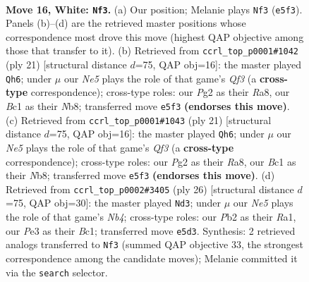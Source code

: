\documentclass[11pt]{article}
\begin{document}
\clearpage

\begin{figure}[p]\centering
\begin{subfigure}{0.46\textwidth}\centering
\resizebox{\linewidth}{!}{%
\newchessgame
\chessboard[
  setfen={r1b1k2r/ppq3pp/2pb4/3pNp2/3P4/1Q2P3/PP3PPP/1RB1K2R w K - 2 16},
  showmover=false,
  pgfstyle=straightmove, color=movearrow, markmove={e5-f3}
]}
\caption{}
\end{subfigure}\hfill
\begin{subfigure}{0.46\textwidth}\centering
\resizebox{\linewidth}{!}{%
\newchessgame
\chessboard[
  setfen={rn2kb1r/p2p1ppp/1p2pq2/8/2PB4/P3PP2/1P3P1P/R2QKB1R b KQkq - 0 11},
  showmover=false,
  pgfstyle=straightmove, color=movearrow, markmove={f6-h6}
]}
\caption{}
\end{subfigure}
\\[4pt]
\begin{subfigure}{0.46\textwidth}\centering
\resizebox{\linewidth}{!}{%
\newchessgame
\chessboard[
  setfen={rn2kb1r/p2p1ppp/1p2pq2/8/2PB4/P3PP2/1P3P1P/R2QKB1R b KQkq - 0 11},
  showmover=false,
  pgfstyle=straightmove, color=movearrow, markmove={f6-h6}
]}
\caption{}
\end{subfigure}\hfill
\begin{subfigure}{0.46\textwidth}\centering
\resizebox{\linewidth}{!}{%
\newchessgame
\chessboard[
  setfen={r1b1k2r/3q1ppp/4pb2/p1Pp4/1N1P4/2P5/P4PPP/R1BQK2R w KQkq - 0 14},
  showmover=false,
  pgfstyle=straightmove, color=movearrow, markmove={b4-d3}
]}
\caption{}
\end{subfigure}
\caption{\textbf{Move 16, White: \texttt{Nf3}.} (a) Our position; Melanie plays \texttt{Nf3} (\texttt{e5f3}). Panels (b)--(d) are the retrieved master positions whose correspondence most drove this move (highest QAP objective among those that transfer to it). (b) Retrieved from \texttt{ccrl\_top\_p0001\#1042} (ply 21) [structural distance $d$=75, QAP obj=16]: the master played \texttt{Qh6}; under $\mu$ our \emph{Ne5} plays the role of that game's \emph{Qf3} (a \textbf{cross-type} correspondence); cross-type roles: our \emph{P}g2 as their \emph{R}a8, our \emph{B}c1 as their \emph{N}b8; transferred move \texttt{e5f3} \textbf{(endorses this move)}. (c) Retrieved from \texttt{ccrl\_top\_p0001\#1043} (ply 21) [structural distance $d$=75, QAP obj=16]: the master played \texttt{Qh6}; under $\mu$ our \emph{Ne5} plays the role of that game's \emph{Qf3} (a \textbf{cross-type} correspondence); cross-type roles: our \emph{P}g2 as their \emph{R}a8, our \emph{B}c1 as their \emph{N}b8; transferred move \texttt{e5f3} \textbf{(endorses this move)}. (d) Retrieved from \texttt{ccrl\_top\_p0002\#3405} (ply 26) [structural distance $d$=75, QAP obj=30]: the master played \texttt{Nd3}; under $\mu$ our \emph{Ne5} plays the role of that game's \emph{Nb4}; cross-type roles: our \emph{P}b2 as their \emph{R}a1, our \emph{P}e3 as their \emph{B}c1; transferred move \texttt{e5d3}. Synthesis: 2 retrieved analogs transferred to \texttt{Nf3} (summed QAP objective 33, the strongest correspondence among the candidate moves); Melanie committed it via the \texttt{search} selector.}
\label{fig:thought-m30}
\end{figure}
\end{document}
